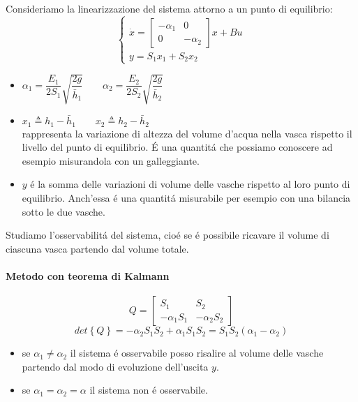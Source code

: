 \documentclass[../main.tex]{subfiles}
\begin{document}
		\begin{mdframed}[style=Exercise]
			\begin{Exercise}[title={Studiare l'osservabilit\'a di due vasche in parallelo}]
				Consideriamo la linearizzazione del sistema attorno a un punto di equilibrio:
				\[
					\begin{cases}
						\dot x=
						\begin{bmatrix}
							-\alpha_1 & 0\\
							0 & -\alpha_2
						\end{bmatrix} x + Bu	
						\\
						y = S_1 x_1 + S_2 x_2
					\end{cases}
				\]
				\begin{itemize}
					\item 
						$ \alpha_1 = \dfrac{E_1}{2S_1} \sqrt{\dfrac{2g}{\overset{}{\bar h_1}}} \qquad \alpha_2 = \dfrac{E_2}{2S_2} \sqrt{\dfrac{2g}{\overset{}{\bar h_2}}} $ 
					\item 
						$ x_1 \triangleq h_1 - \bar h_1 \qquad x_2 \triangleq h_2 - \bar h_2 $\\
						rappresenta la variazione di altezza del volume d'acqua nella vasca rispetto il livello del punto di equilibrio. \'E una quantit\'a che possiamo conoscere ad esempio misurandola con un galleggiante.
					\item 
						$ y $ \'e la somma delle variazioni di volume delle vasche rispetto al loro punto di equilibrio. Anch'essa \'e una quantit\'a misurabile per esempio con una bilancia sotto le due vasche. 
				\end{itemize}
			
				Studiamo l'osservabilit\'a del sistema, cio\'e se \'e possibile ricavare il volume di ciascuna vasca partendo dal volume totale.
				
				\paragraph{Metodo con teorema di Kalmann}
					\[
						Q =
						\begin{bmatrix}
							S_1 & S_2\\
							-\alpha_1 S_1 & -\alpha_2 S_2
						\end{bmatrix}
					\]
					\[
						det\left\lbrace Q \right\rbrace = -\alpha_2 S_1 S_2 + \alpha_1 S_1 S_2 = S_1 S_2 (\alpha_1 - \alpha_2)
					\]
					
					\begin{itemize}
						\item 
							se $ \alpha_1 \neq \alpha_2 $ il sistema \'e osservabile posso risalire al volume delle vasche partendo dal modo di evoluzione dell'uscita $ y $.
						\item 
							se $ \alpha_1 = \alpha_2 = \alpha $ il sistema non \'e osservabile.
					\end{itemize}
				

\end{Exercise}
\end{mdframed}
\end{document}
